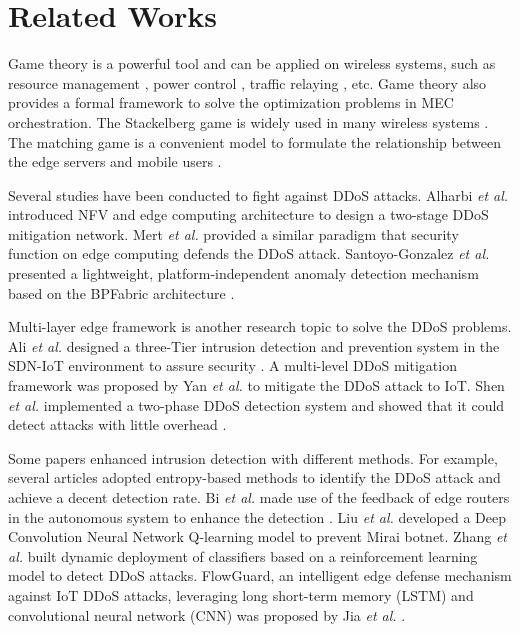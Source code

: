 \documentclass[10pt,journal, compsoc]{IEEEtran}
\begin{document}
\section{Related Works}

Game theory is a powerful tool and can be applied on wireless systems, such as resource management \cite{Xu} \cite{Chen2}, power control \cite{Li3} \cite{Zhao}, traffic relaying \cite{Li4}, etc. Game theory also provides a formal framework to solve the optimization problems in MEC orchestration. The Stackelberg game is widely used in many wireless systems \cite{Chang} \cite{Wang2} \cite{Lin2} \cite{Yu}. The matching game is a convenient model to formulate the relationship between the edge servers and mobile users \cite{Liu2}. 

Several studies have been conducted to fight against DDoS attacks.  Alharbi \emph{et al.} introduced NFV and edge computing architecture to design a two-stage DDoS mitigation network\cite{Alharbi}. Mert \emph{et al.}  provided a similar paradigm that security function on edge computing defends the DDoS attack\cite{Mert}. Santoyo-Gonzalez \emph{et al.} presented a lightweight, platform-independent anomaly
detection mechanism based on the BPFabric architecture \cite{Santoyo-Gonzalez}. 

Multi-layer edge framework is another research topic to solve the DDoS problems. Ali \emph{et al.} designed a three-Tier intrusion detection and prevention system in the SDN-IoT environment to assure security \cite{Ali}. A multi-level DDoS mitigation framework \cite{Yan} was proposed by Yan \emph{et al.}  to mitigate the DDoS attack to IoT. Shen \emph{et al.} implemented a two-phase DDoS detection system and showed that it could detect attacks with little overhead \cite{Shen} .

Some papers enhanced intrusion detection with different methods. For example, several articles adopted entropy-based methods to identify the DDoS attack and achieve a decent detection rate\cite{Wang}\cite{Xuanyuan}. Bi \emph{et al.} made use of the feedback of edge routers in the autonomous system to enhance the detection \cite{Bi}. Liu \emph{et al.} developed a Deep Convolution Neural Network Q-learning model to prevent Mirai botnet\cite{Liu}. Zhang \emph{et al.} built dynamic deployment of classifiers based on a reinforcement learning model to detect DDoS attacks\cite{Zhang}. FlowGuard, an intelligent edge defense mechanism against IoT DDoS attacks, leveraging long short-term memory (LSTM) and convolutional neural network (CNN) \cite{Jia} was proposed by Jia \emph{et al.} .
\end{document}
